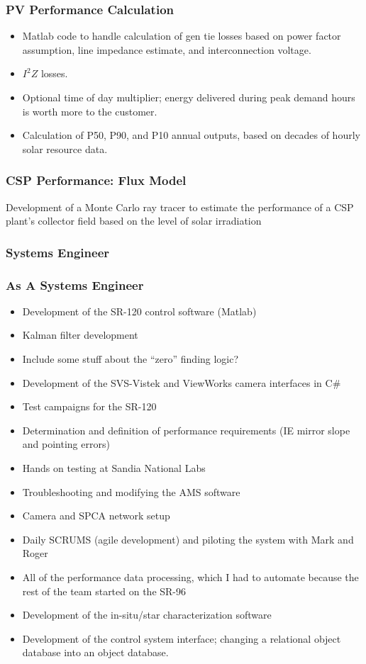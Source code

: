\documentclass[aspectratio=169]{beamer}
\begin{document}
\begin{frame}
  \frametitle{PV Performance Calculation}
  \begin{itemize}
  \item Matlab code to handle calculation of gen tie losses based on
    power factor assumption, line impedance estimate, and
    interconnection voltage.
  \item $I^{2}Z$ losses.
  \item Optional time of day multiplier; energy delivered during peak
    demand hours is worth more to the customer.
  \item Calculation of P50, P90, and P10 annual outputs, based on
    decades of hourly solar resource data.
  \end{itemize}
\end{frame}

\begin{frame}
  \frametitle{CSP Performance: Flux Model} Development of a Monte
  Carlo ray tracer to estimate the performance of a CSP plant's
  collector field based on the level of solar irradiation
\end{frame}

\subsubsection{Systems Engineer}
\begin{frame}
  \frametitle{As A Systems Engineer}
  \begin{itemize}
  \item Development of the SR-120 control software (Matlab)
  \item Kalman filter development
  \item Include some stuff about the ``zero'' finding logic?
  \item Development of the SVS-Vistek and ViewWorks camera interfaces
    in C\#
  \item Test campaigns for the SR-120
  \item Determination and definition of performance requirements (IE
    mirror slope and pointing errors)
  \item Hands on testing at Sandia National Labs
  \item Troubleshooting and modifying the AMS software
  \item Camera and SPCA network setup
  \item Daily SCRUMS (agile development) and piloting the system with
    Mark and Roger
  \item All of the performance data processing, which I had to
    automate because the rest of the team started on the SR-96
  \item Development of the in-situ/star characterization software
  \item Development of the control system interface; changing a
    relational object database into an object database.
  \end{itemize}
\end{frame}
\end{document}
